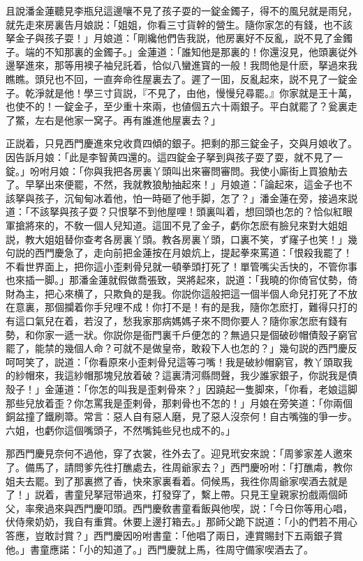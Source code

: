 且說潘金蓮聽見李瓶兒這邊嚷不見了孩子耍的一錠金鐲子，得不的風兒就是雨兒，就先走來房裏告月娘説：「姐姐，你看三寸貨幹的營生。隨你家怎的有錢，也不該拏金子與孩子耍！」月娘道：「剛纔他們告我説，他房裏好不反亂，説不見了金鐲子。端的不知那裏的金鐲子。」金蓮道：「誰知他是那裏的！你還沒見，他頭裏従外邊拏進來，那等用襖子袖兒託着，恰似八蠻進寳的一般！我問他是什麽，拏過來我瞧瞧。頭兒也不回，一直奔命徃屋裏去了。遲了一囬，反亂起來，説不見了一錠金子。乾淨就是他！學三寸貨説，『不見了，由他，慢慢兒尋罷。』你家就是王十萬，也使不的！一錠金子，至少重十來兩，也値個五六十兩銀子。平白就罷了？瓮裏走了鱉，左右是他家一窝子。再有誰進他屋裏去？」

正説着，只見西門慶進來兌收賁四傾的銀子。把剩的那三錠金子，交與月娘收了。因告訴月娘：「此是李智黄四還的。這四錠金子拏到與孩子耍了耍，就不見了一錠。」吩咐月娘：「你與我把各房裏丫頭叫出來審問審問。我使小廝街上買狼觔去了。早拏出來便罷，不然，我就教狼觔抽起來！」月娘道：「論起來，這金子也不該拏與孩子，沉甸甸冰着他，怕一時砸了他手脚，怎了？」潘金蓮在旁，接過來説道：「不該拏與孩子耍？只恨拏不到他屋哩！頭裏叫着，想回頭也怎的？恰似紅眼軍搶將來的，不敎一個人兒知道。這囬不見了金子，虧你怎麽有臉兒來對大姐姐説，教大姐姐替你查考各房裏丫頭。教各房裏丫頭，口裏不笑，ず窿子也笑！」幾句説的西門慶急了，走向前把金蓮按在月娘炕上，提起拳來罵道：「恨殺我罷了！不看世界面上，把你這小歪剌骨兒就一頓拳頭打死了！單管嘴尖舌快的，不管你事也來插一脚。」那潘金蓮就假做喬張致，哭將起來，説道：「我曉的你倚官仗勢，倚財為主，把心來横了，只欺負的是我。你説你這般把這一個半個人命兒打死了不放在意裏，那個攔着你手兒哩不成！你打不是！有的是我，隨你怎麽打，難得只打的有這口氣兒在着，若沒了，愁我家那病媽媽子來不問你要人？隨你家怎麽有錢有勢，和你家一遞一狀。你説你是衙門裏千戶便怎的？無過只是個破砂帽債殼子窮官罷了，能禁的幾個人命？可就不是做皇帝，敢殺下人也怎的？」幾句説的西門慶反呵呵笑了，説道：「你看原來小歪剌骨兒這等刁嘴！我是破紗帽窮官，教丫頭取我的紗帽來，我這紗帽那塊兒放着破？這裏清河縣問聲，我少誰家銀子，你説我是債殼子！」金蓮道：「你怎的叫我是歪剌骨來？」因蹺起一隻脚來，「你看，老娘這脚那些兒放着歪？你怎罵我是歪剌骨，那剌骨也不怎的！」月娘在旁笑道：「你兩個銅盆撞了鐵刷箒。常言：惡人自有惡人磨，見了惡人沒奈何！自古嘴強的爭一步。六姐，也虧你這個嘴頭子，不然嘴鈍些兒也成不的。」

那西門慶見奈何不過他，穿了衣裳，徃外去了。迎見玳安來說：「周爹家差人邀來了。備馬了，請問爹先徃打醮處去，徃周爺家去？」西門慶吩咐：「打醮䖏，教你姐夫去罷。到了那裏撚了香，快來家裏看着。伺候馬，我徃你周爺家喫酒去就是了！」説着，書童兒拏冠带過來，打發穿了，繫上帶。只見王皇親家扮戲兩個師父，率衆過來與西門慶叩頭。西門慶敎書童看飯與他喫，説：「今日你等用心唱，伏侍衆奶奶，我自有重賞。休要上邊打箱去。」那師父跪下説道：「小的們若不用心答應，豈敢討賞？」西門慶因吩咐書童：「他唱了兩日，連賞賜封下五兩銀子賞他。」書童應諾：「小的知道了。」西門慶就上馬，徃周守備家喫酒去了。

